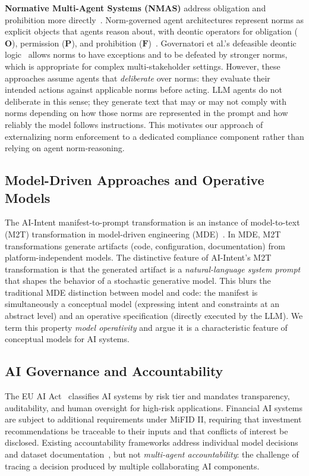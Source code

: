 \documentclass[runningheads]{llncs}
\begin{document}
\textbf{Normative Multi-Agent Systems (NMAS)} address obligation and
prohibition more directly~\cite{boella2006introduction,
governatori2005meeting,dignum1999autonomous}. Norm-governed agent
architectures represent norms as explicit objects that agents reason
about, with deontic operators for obligation ($\mathbf{O}$), permission
($\mathbf{P}$), and prohibition ($\mathbf{F}$)~\cite{vonwright1951essay}.
Governatori et al.'s defeasible deontic
logic~\cite{governatori2005meeting} allows norms to have exceptions and
to be defeated by stronger norms, which is appropriate for complex
multi-stakeholder settings. However, these approaches assume agents that
\emph{deliberate} over norms: they evaluate their intended actions
against applicable norms before acting. LLM agents do not deliberate in
this sense; they generate text that may or may not comply with norms
depending on how those norms are represented in the prompt and how
reliably the model follows instructions. This motivates our approach of
externalizing norm enforcement to a dedicated compliance component
rather than relying on agent norm-reasoning.

\subsection{Model-Driven Approaches and Operative Models}

The AI-Intent manifest-to-prompt transformation is an instance of
model-to-text (M2T) transformation in model-driven engineering
(MDE)~\cite{brambilla2012model}. In MDE, M2T transformations generate
artifacts (code, configuration, documentation) from platform-independent
models. The distinctive feature of AI-Intent's M2T transformation is that
the generated artifact is a \emph{natural-language system prompt} that
shapes the behavior of a stochastic generative model. This blurs the
traditional MDE distinction between model and code: the manifest is
simultaneously a conceptual model (expressing intent and constraints at
an abstract level) and an operative specification (directly executed by
the LLM). We term this property \emph{model operativity} and argue it is
a characteristic feature of conceptual models for AI systems.

\subsection{AI Governance and Accountability}

The EU AI Act~\cite{euaiact2024} classifies AI systems by risk tier and
mandates transparency, auditability, and human oversight for high-risk
applications. Financial AI systems are subject to additional requirements
under MiFID II, requiring that investment recommendations be traceable to
their inputs and that conflicts of interest be disclosed. Existing
accountability frameworks address individual model
decisions~\cite{arrieta2020explainable} and dataset
documentation~\cite{gebru2021datasheets,mitchell2019model}, but not
\emph{multi-agent accountability}: the challenge of tracing a decision
produced by multiple collaborating AI components.
\end{document}
